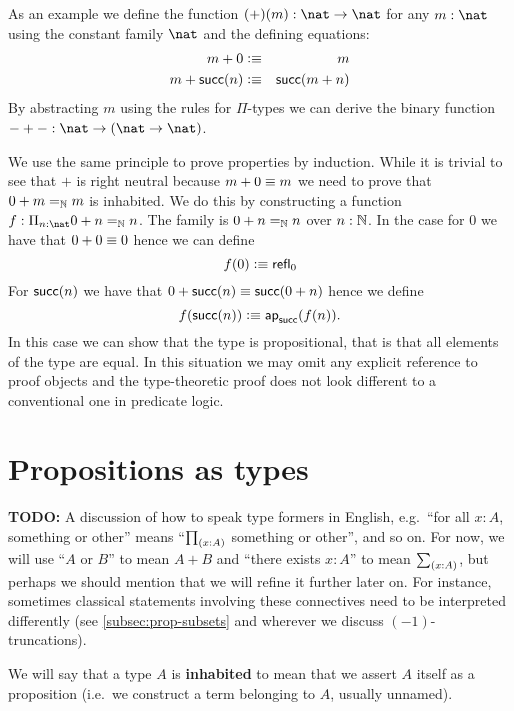 As an example we define the function $(+)(m) : \nat \to \nat$ for any
$m : \nat$ using the constant family $\nat$ and the defining
equations:
\begin{eqnarray*}
  m + 0 & \vcentcolon\equiv & m \\
  m + \mathsf{succ}(n) & \vcentcolon\equiv & \mathsf{succ}(m + n)
\end{eqnarray*}
By abstracting $m$ using the rules for $\Pi$-types we can derive the
binary function $- + - : \nat \to (\nat \to \nat)$.

We use the same principle to prove properties by induction. While it
is trivial to see that $+$ is right neutral because $m + 0 \equiv m$
we need to prove that $0 + m =_\mathbb{N} m$ is inhabited. We do this by
constructing a function $f : \Pi_{n : \nat} 0 + n =_\Nat n$. 
The family is $0 + n =_\mathbb{N} n$ over $n : \mathbb{N}$. In the case
for $0$ we have that $0 + 0 \equiv 0$ hence we can define
\[ f(0) \vcentcolon\equiv \mathsf{refl}_{0} \]
For $\mathsf{succ}(n)$ we have that $0 + \mathsf{succ}(n) \equiv \mathsf{succ}(0 +
n)$ hence we define 
\[ f(\mathsf{succ}(n)) \vcentcolon\equiv \mathsf{ap}_{\mathsf{succ}}(f(n)). \]
In this case we can show that the type is propositional, that is that
all elements of the type are equal. In this situation we may omit any
explicit reference to proof objects and the type-theoretic proof does
not look different to a conventional one in predicate logic. 

\section{Propositions as types}
\label{sec:pat}

\textbf{TODO:} A discussion of how to speak type formers in English, e.g.\ ``for all $x:A$, something or other'' means ``$\prd{x:A}$ something or other'', and so on.
For now, we will use ``$A$ or $B$'' to mean $A+B$ and ``there exists $x:A$'' to mean $\sm{x:A}$, but perhaps we should mention that we will refine it further later on.
For instance, sometimes classical statements involving these connectives need to be interpreted differently (see \autoref{subsec:prop-subsets} and wherever we discuss $(-1)$-truncations).

We will say that a type $A$ is \textbf{inhabited} to mean that we assert $A$ itself as a proposition (i.e.\ we construct a term belonging to $A$, usually unnamed).




